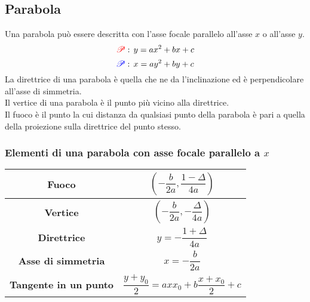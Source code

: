 \subsection{Parabola}\label{subsec:geomanal:parabola}
\begin{center}
\end{center}
Una parabola può essere descritta con l'asse focale parallelo all'asse $x$ o all'asse $y$.
\begin{equation*}
  \mathcolor{red}{\mathscr{P}}:\,y=ax^2+bx+c
\end{equation*}
\begin{equation*}
  \mathcolor{blue}{\mathscr{P}}:\,x=ay^2+by+c
\end{equation*}
La direttrice di una parabola è quella che ne da l'inclinazione ed è perpendicolare all'asse di
simmetria.\\
Il vertice di una parabola è il punto più vicino alla direttrice.\\
Il fuoco è il punto la cui distanza da qualsiasi punto della parabola è pari a quella della proiezione
sulla direttrice del punto stesso.

\subsubsection{Elementi di una parabola con asse focale parallelo a $x$}
\begin{center}
  \begin{tabular}{c | c}
    \textbf{Fuoco} & $\left(-\dfrac{b}{2a},\dfrac{1-\Delta}{4a}\right)$\\\hline
    \textbf{Vertice} & $\left(-\dfrac{b}{2a}, -\dfrac{\Delta}{4a}\right)$\\\hline
    \textbf{Direttrice} & $y=-\dfrac{1+\Delta}{4a}$\\\hline
    \textbf{Asse di simmetria} & $x=-\dfrac{b}{2a}$\\\hline
    \textbf{Tangente in un punto} & $\dfrac{y+y_0}{2}=axx_0+b\dfrac{x+x_0}{2}+c$
  \end{tabular}
\end{center}

